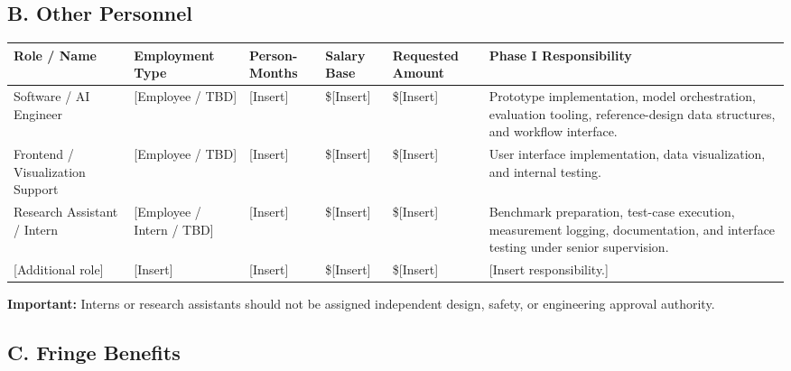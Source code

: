 \documentclass[11pt,letterpaper]{article}
\begin{document}
\subsection*{B. Other Personnel}

\begin{table}[htbp]
\centering
\renewcommand{\arraystretch}{1.25}
\begin{tabularx}{\textwidth}{
    p{}
    p{}
    p{}
    p{}
    p{}
    X
}
\toprule
\textbf{Role / Name} &
\textbf{Employment Type} &
\textbf{Person-Months} &
\textbf{Salary Base} &
\textbf{Requested Amount} &
\textbf{Phase I Responsibility} \\
\midrule

Software / AI Engineer &
[Employee / TBD] &
[Insert] &
\$[Insert] &
\$[Insert] &
Prototype implementation, model orchestration, evaluation tooling,
reference-design data structures, and workflow interface. \\

Frontend / Visualization Support &
[Employee / TBD] &
[Insert] &
\$[Insert] &
\$[Insert] &
User interface implementation, data visualization, and internal testing. \\

Research Assistant / Intern &
[Employee / Intern / TBD] &
[Insert] &
\$[Insert] &
\$[Insert] &
Benchmark preparation, test-case execution, measurement logging,
documentation, and interface testing under senior supervision. \\

[Additional role] &
[Insert] &
[Insert] &
\$[Insert] &
\$[Insert] &
[Insert responsibility.] \\

\bottomrule
\end{tabularx}
\end{table}

\noindent
\textbf{Important:}
Interns or research assistants should not be assigned independent design,
safety, or engineering approval authority.

\subsection*{C. Fringe Benefits}
\end{document}
